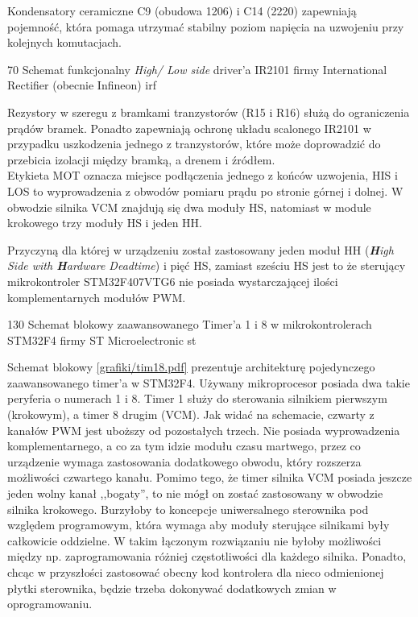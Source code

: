 Kondensatory ceramiczne C9 (obudowa 1206) i C14 (2220) zapewniają pojemność, która pomaga utrzymać stabilny poziom napięcia na uzwojeniu przy kolejnych komutacjach. 

	{70}
	{Schemat funkcjonalny {\it High/ Low side} driver'a IR2101 firmy International Rectifier (obecnie Infineon)}
	{irf}

Rezystory w szeregu z bramkami tranzystorów (R15 i R16) służą do ograniczenia prądów bramek. Ponadto zapewniają ochronę układu scalonego IR2101 w przypadku uszkodzenia jednego z tranzystorów, które może doprowadzić do przebicia izolacji między bramką, a drenem i źródłem. \\

Etykieta MOT oznacza miejsce podłączenia jednego z końców uzwojenia, HIS i LOS to wyprowadzenia z obwodów pomiaru prądu po stronie górnej i dolnej. W \linebreak obwodzie silnika VCM znajdują się dwa moduły HS, natomiast w module krokowego trzy moduły HS i jeden HH.


Przyczyną dla której w urządzeniu został zastosowany jeden moduł HH (\textit{\textbf{H}igh Side with \textbf{H}ardware Deadtime}) i pięć HS, zamiast sześciu HS jest to że sterujący mikrokontroler STM32F407VTG6 nie posiada wystarczającej ilości komplementarnych modułów PWM.

	{130}
	{Schemat blokowy zaawansowanego Timer'a 1 i 8 w mikrokontrolerach STM32F4 firmy ST Microelectronic}
	{st}

Schemat blokowy \ref{grafiki/tim18.pdf} prezentuje architekturę pojedynczego zaawansowanego timer'a w STM32F4. Używany mikroprocesor posiada dwa takie peryferia o numerach 1 i 8. Timer 1 służy do sterowania silnikiem pierwszym (krokowym), a timer 8 drugim (VCM). Jak widać na schemacie, czwarty z kanałów PWM jest uboższy od pozostałych trzech. Nie posiada wyprowadzenia komplementarnego, a co za tym idzie modułu czasu martwego, przez co urządzenie wymaga zastosowania dodatkowego obwodu, który rozszerza możliwości czwartego kanału. Pomimo tego, że timer silnika VCM posiada jeszcze jeden wolny kanał ,,bogaty'', to nie mógł on zostać zastosowany w obwodzie silnika krokowego. Burzyłoby to koncepcje uniwersalnego sterownika pod względem programowym, która wymaga aby moduły sterujące silnikami były całkowicie oddzielne. W takim łączonym rozwiązaniu nie byłoby możliwości między np. zaprogramowania różniej częstotliwości dla każdego silnika. Ponadto, chcąc w przyszłości zastosować obecny kod kontrolera dla nieco odmienionej płytki sterownika, będzie trzeba dokonywać dodatkowych zmian \linebreak w oprogramowaniu.

